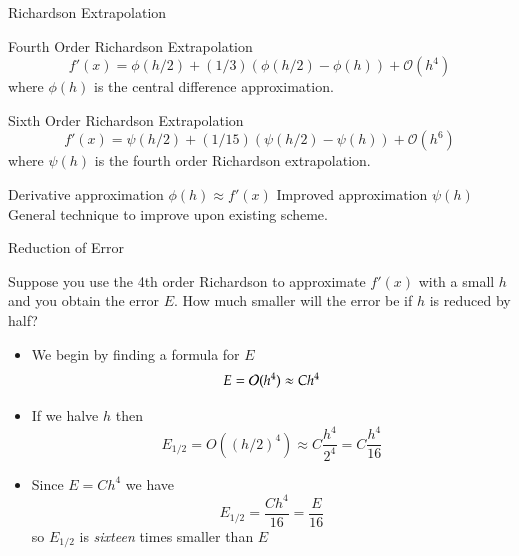 \documentclass[10pt]{beamer}
\begin{document}
\begin{frame}{Richardson Extrapolation}

    \begin{block}{Fourth Order Richardson Extrapolation}
    \begin{equation*}
     f'(x) = \phi(h/2) + (1/3) (\phi(h/2) - \phi(h)) + \mathcal{O}(h^4)
    \end{equation*}
    where $\phi(h)$ is the central difference approximation.
    \end{block}

        \begin{block}{Sixth Order Richardson Extrapolation}
    \begin{equation*}
      f'(x) = \psi(h/2) + (1/15)(\psi(h/2) - \psi(h)) + \mathcal{O}(h^6)
    \end{equation*}
    where $\psi(h)$ is the fourth order Richardson extrapolation.
    \end{block}
    
{Derivative approximation $\phi(h) \approx f'(x)$}
{Improved approximation $\psi(h)$ }
{General technique to improve upon existing scheme.}
\end{frame}
\begin{frame}{Reduction of Error}
\begin{example}
    Suppose you use the 4th order Richardson to approximate $f'(x)$ with a small $h$ and you obtain the error $E$. How much smaller will the error be if $h$ is reduced by half?
\end{example}
\begin{itemize}
    \item We begin by finding a formula for $E$
    $$E = {\mathcal{O}}(h^4) \approx Ch^4 $$

    \item If we halve $h$ then 
    $$E_{1/2} = O((h/2)^4) \approx C \frac{h^4}{2^4}=C\frac{h^4}{16}$$

    \item Since $E=Ch^4$ we have 
    $$E_{1/2} = \frac{Ch^4}{16} = \frac{E}{16}$$
    so $E_{1/2}$ is \textit{sixteen} times smaller than $E$
\end{itemize}
\end{frame}
\end{document}
